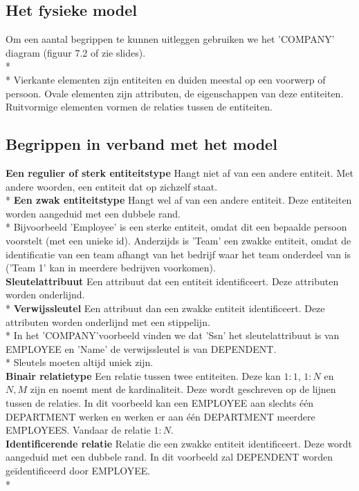 \documentclass[10pt]{article}
\begin{document}
\subsection{Het fysieke model}
Om een aantal begrippen te kunnen uitleggen gebruiken we het 'COMPANY' diagram (figuur 7.2 of zie slides).\\*\\*
Vierkante elementen zijn entiteiten en duiden meestal op een voorwerp of persoon. Ovale elementen zijn attributen, de eigenschappen van deze entiteiten. Ruitvormige elementen vormen de relaties tussen de entiteiten.
\subsection{Begrippen in verband met het model}
\textbf{Een regulier of sterk entiteitstype} Hangt niet af van een andere entiteit. Met andere woorden, een entiteit dat op zichzelf staat.\\*
\textbf{Een zwak entiteitstype} Hangt wel af van een andere entiteit. Deze entiteiten worden aangeduid met een dubbele rand.\\*
Bijvoorbeeld 'Employee' is een sterke entiteit, omdat dit een bepaalde persoon voorstelt (met een unieke id). Anderzijds is 'Team' een zwakke entiteit, omdat de identificatie van een team afhangt van het bedrijf waar het team onderdeel van is ('Team 1' kan in meerdere bedrijven voorkomen).\\
\textbf{Sleutelattribuut} Een attribuut dat een entiteit identificeert. Deze attributen worden onderlijnd.\\*
\textbf{Verwijssleutel} Een attribuut dan een zwakke entiteit identificeert. Deze attributen worden onderlijnd met een stippelijn.\\*
In het 'COMPANY'voorbeeld vinden we dat 'Ssn' het sleutelattribuut is van EMPLOYEE en 'Name' de verwijssleutel is van DEPENDENT.\\*
Sleutels moeten altijd uniek zijn.\\
\textbf{Binair relatietype} Een relatie tussen twee entiteiten. Deze kan $1:1$, $1:N$ en $N,M$ zijn en noemt ment de kardinaliteit. Deze wordt geschreven op de lijnen tussen de relaties. In dit voorbeeld kan een EMPLOYEE aan slechts \'e\'en DEPARTMENT werken en werken er aan \'e\'en DEPARTMENT meerdere EMPLOYEES. Vandaar de relatie $1:N$.\\
\textbf{Identificerende relatie} Relatie die een zwakke entiteit identificeert. Deze wordt aangeduid met een dubbele rand. In dit voorbeeld zal DEPENDENT worden ge\"identificeerd door EMPLOYEE.\\*
\end{document}
